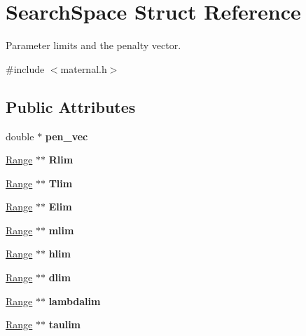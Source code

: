 \hypertarget{structSearchSpace}{
\section{SearchSpace Struct Reference}
\label{structSearchSpace}
}


Parameter limits and the penalty vector.  


{\ttfamily \#include $<$maternal.h$>$}\subsection*{Public Attributes}
\begin{DoxyCompactItemize}
\item 
\hypertarget{structSearchSpace_ac6b7ecb94e74e6377f026462830731fd}{
double $\ast$ {\bfseries pen\_\-vec}}
\label{structSearchSpace_ac6b7ecb94e74e6377f026462830731fd}

\item 
\hypertarget{structSearchSpace_a7ecf26b848802df69e62177035dfa2d4}{
\hyperlink{structRange}{Range} $\ast$$\ast$ {\bfseries Rlim}}
\label{structSearchSpace_a7ecf26b848802df69e62177035dfa2d4}

\item 
\hypertarget{structSearchSpace_af560acb08a90667c57c7e9d28b6d644c}{
\hyperlink{structRange}{Range} $\ast$$\ast$ {\bfseries Tlim}}
\label{structSearchSpace_af560acb08a90667c57c7e9d28b6d644c}

\item 
\hypertarget{structSearchSpace_aa373693c25f82f6ff7431ece510ce5ac}{
\hyperlink{structRange}{Range} $\ast$$\ast$ {\bfseries Elim}}
\label{structSearchSpace_aa373693c25f82f6ff7431ece510ce5ac}

\item 
\hypertarget{structSearchSpace_aec04b2dcfbdd8635a152b7791285e29e}{
\hyperlink{structRange}{Range} $\ast$$\ast$ {\bfseries mlim}}
\label{structSearchSpace_aec04b2dcfbdd8635a152b7791285e29e}

\item 
\hypertarget{structSearchSpace_a19746cecccaa1677ecff0c6e5af88802}{
\hyperlink{structRange}{Range} $\ast$$\ast$ {\bfseries hlim}}
\label{structSearchSpace_a19746cecccaa1677ecff0c6e5af88802}

\item 
\hypertarget{structSearchSpace_ac9b980f73059dfe5a3a81618b40a9c74}{
\hyperlink{structRange}{Range} $\ast$$\ast$ {\bfseries dlim}}
\label{structSearchSpace_ac9b980f73059dfe5a3a81618b40a9c74}

\item 
\hypertarget{structSearchSpace_a8cee00691cfabd4660c336d63d8f817a}{
\hyperlink{structRange}{Range} $\ast$$\ast$ {\bfseries lambdalim}}
\label{structSearchSpace_a8cee00691cfabd4660c336d63d8f817a}

\item 
\hypertarget{structSearchSpace_a086077c88d89a812b14bb4fdc6ef5290}{
\hyperlink{structRange}{Range} $\ast$$\ast$ {\bfseries taulim}}
\label{structSearchSpace_a086077c88d89a812b14bb4fdc6ef5290}

\end{DoxyCompactItemize}


